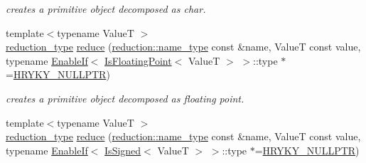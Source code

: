 \begin{DoxyCompactItemize}
\begin{DoxyCompactList}\small\item\em creates a primitive object decomposed as char. \end{DoxyCompactList}\item 
\hypertarget{namespacehryky_ada502f50939bc4ff0a7d1608c8478c7a}{{\footnotesize template$<$typename Value\-T $>$ }\\\hyperlink{namespacehryky_a343a9a4c36a586be5c2693156200eadc}{reduction\-\_\-type} \hyperlink{namespacehryky_ada502f50939bc4ff0a7d1608c8478c7a}{reduce} (\hyperlink{namespacehryky_1_1reduction_ac686c30a4c8d196bbd0f05629a6b921f}{reduction\-::name\-\_\-type} const \&name, Value\-T const value, typename \hyperlink{classhryky_1_1_enable_if}{Enable\-If}$<$ \hyperlink{classhryky_1_1_is_floating_point}{Is\-Floating\-Point}$<$ Value\-T $>$ $>$\-::type $\ast$=\hyperlink{common_8h_a4cd4ac09cfcdbd6b30ee69afc156e210}{H\-R\-Y\-K\-Y\-\_\-\-N\-U\-L\-L\-P\-T\-R})}\label{namespacehryky_ada502f50939bc4ff0a7d1608c8478c7a}

\begin{DoxyCompactList}\small\item\em creates a primitive object decomposed as floating point. \end{DoxyCompactList}\item 
\hypertarget{namespacehryky_a1d94625c1d85aec5bb089848cd55eaf3}{{\footnotesize template$<$typename Value\-T $>$ }\\\hyperlink{namespacehryky_a343a9a4c36a586be5c2693156200eadc}{reduction\-\_\-type} \hyperlink{namespacehryky_a1d94625c1d85aec5bb089848cd55eaf3}{reduce} (\hyperlink{namespacehryky_1_1reduction_ac686c30a4c8d196bbd0f05629a6b921f}{reduction\-::name\-\_\-type} const \&name, Value\-T const value, typename \hyperlink{classhryky_1_1_enable_if}{Enable\-If}$<$ \hyperlink{classhryky_1_1_is_signed}{Is\-Signed}$<$ Value\-T $>$ $>$\-::type $\ast$=\hyperlink{common_8h_a4cd4ac09cfcdbd6b30ee69afc156e210}{H\-R\-Y\-K\-Y\-\_\-\-N\-U\-L\-L\-P\-T\-R})}\label{namespacehryky_a1d94625c1d85aec5bb089848cd55eaf3}


\end{DoxyCompactItemize}
